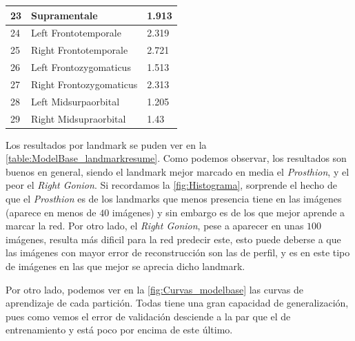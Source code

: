\begin{table}[!ht]
\begin{tabular}{|l|l|l|}
                    23 & Supramentale & 1.913 \\ \hline
                    24 & Left Frontotemporale & 2.319 \\ \hline
                    25 & Right Frontotemporale & 2.721 \\ \hline
                    26 & Left Frontozygomaticus & 1.513 \\ \hline
                    27 & Right Frontozygomaticus & 2.313 \\ \hline
                    28 & Left Midsurpaorbital & 1.205 \\ \hline
                    29 & Right Midsupraorbital & 1.43 \\ \hline
                \end{tabular}
                \label{table:ModelBase_landmarkresume}
            \end{table}

            \medskip

            \noindent Los resultados por landmark se puden ver en la \autoref{table:ModelBase_landmarkresume}. Como podemos observar, los resultados son buenos en general, siendo el landmark mejor marcado en media el \textit{Prosthion}, y el peor el \textit{Right Gonion}. Si recordamos la \autoref{fig:Histograma}, sorprende el hecho de que el \textit{Prosthion} es de los landmarks que menos presencia tiene en las imágenes (aparece en menos de $40$ imágenes) y sin embargo es de los que mejor aprende a marcar la red. Por otro lado, el \textit{Right Gonion}, pese a aparecer en unas $100$ imágenes, resulta más dificil para la red predecir este, esto puede deberse a que las imágenes con mayor error de reconstrucción son las de perfil, y es en este tipo de imágenes en las que mejor se aprecia dicho landmark.

            \medskip

            \noindent Por otro lado, podemos ver en la \autoref{fig:Curvas_modelbase} las curvas de aprendizaje de cada partición. Todas tiene una gran capacidad de generalización, pues como vemos el error de validación desciende a la par que el de entrenamiento y está poco por encima de este último.

